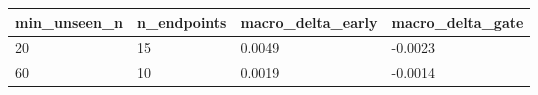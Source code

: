 \begin{tabular}{llll}
\hline
min\_unseen\_n & n\_endpoints & macro\_delta\_early & macro\_delta\_gate \\
\hline
20 & 15 & 0.0049 & -0.0023 \\
60 & 10 & 0.0019 & -0.0014 \\
\hline
\end{tabular}
